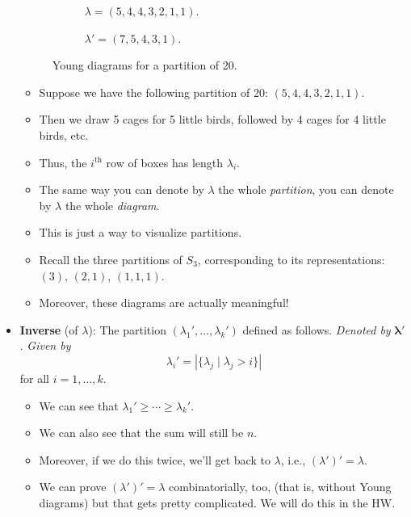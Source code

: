 \documentclass[../notes.tex]{subfiles}
\begin{document}
\begin{itemize}
\begin{figure}[h!]
        \begin{subfigure}[b]{0.3\linewidth}
            \centering
            \caption{$\lambda=(5,4,4,3,2,1,1)$.}
            \label{fig:youngDiagram20a}
        \end{subfigure}
        \begin{subfigure}[b]{0.3\linewidth}
            \centering
            \caption{$\lambda'=(7,5,4,3,1)$.}
            \label{fig:youngDiagram20b}
        \end{subfigure}
        \caption{Young diagrams for a partition of 20.}
        \label{fig:youngDiagram20}
    \end{figure}
    \begin{itemize}
        \item Suppose we have the following partition of 20: $(5,4,4,3,2,1,1)$.
        \item Then we draw 5 cages for 5 little birds, followed by 4 cages for 4 little birds, etc.
        \item Thus, the $i^\text{th}$ row of boxes has length $\lambda_i$.
        \item The same way you can denote by $\lambda$ the whole \emph{partition}, you can denote by $\lambda$ the whole \emph{diagram}.
        \item This is just a way to visualize partitions.
        \item Recall the three partitions of $S_3$, corresponding to its representations: $(3)$, $(2,1)$, $(1,1,1)$.
        \item Moreover, these diagrams are actually meaningful!
    \end{itemize}
    \item \textbf{Inverse} (of $\lambda$): The partition $(\lambda_1',\dots,\lambda_k')$ defined as follows. \emph{Denoted by} $\bm{\lambda'}$. \emph{Given by}
    \begin{equation*}
        \lambda_i' = |\{\lambda_j\mid\lambda_j>i\}|
    \end{equation*}
    for all $i=1,\dots,k$.
    \begin{itemize}
        \item We can see that $\lambda_1'\geq\cdots\geq\lambda_k'$.
        \item We can also see that the sum will still be $n$.
        \item Moreover, if we do this twice, we'll get back to $\lambda$, i.e., $(\lambda')'=\lambda$.
        \item We can prove $(\lambda')'=\lambda$ combinatorially, too, (that is, without Young diagrams) but that gets pretty complicated. We will do this in the HW.

\end{itemize}
\end{itemize}
\end{document}
